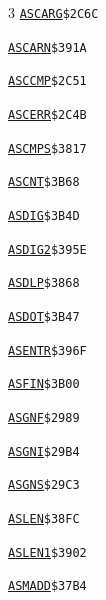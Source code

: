 \begin{multicols}{3}
\noindent\hyperlink{l:ASCARG}{\texttt{ASCARG}}\hfill\texttt{\$2C6C~\phantom{000}\llap{\pageref{l:ASCARG}}}\par
\noindent\hyperlink{l:ASCARN}{\texttt{ASCARN}}\hfill\texttt{\$391A~\phantom{000}\llap{\pageref{l:ASCARN}}}\par
\noindent\hyperlink{l:ASCCMP}{\texttt{ASCCMP}}\hfill\texttt{\$2C51~\phantom{000}\llap{\pageref{l:ASCCMP}}}\par
\noindent\hyperlink{l:ASCERR}{\texttt{ASCERR}}\hfill\texttt{\$2C4B~\phantom{000}\llap{\pageref{l:ASCERR}}}\par
\noindent\hyperlink{l:ASCMPS}{\texttt{ASCMPS}}\hfill\texttt{\$3817~\phantom{000}\llap{\pageref{l:ASCMPS}}}\par
\noindent\hyperlink{l:ASCNT}{\texttt{ASCNT}}\hfill\texttt{\$3B68~\phantom{000}\llap{\pageref{l:ASCNT}}}\par
\noindent\hyperlink{l:ASDIG}{\texttt{ASDIG}}\hfill\texttt{\$3B4D~\phantom{000}\llap{\pageref{l:ASDIG}}}\par
\noindent\hyperlink{l:ASDIG2}{\texttt{ASDIG2}}\hfill\texttt{\$395E~\phantom{000}\llap{\pageref{l:ASDIG2}}}\par
\noindent\hyperlink{l:ASDLP}{\texttt{ASDLP}}\hfill\texttt{\$3868~\phantom{000}\llap{\pageref{l:ASDLP}}}\par
\noindent\hyperlink{l:ASDOT}{\texttt{ASDOT}}\hfill\texttt{\$3B47~\phantom{000}\llap{\pageref{l:ASDOT}}}\par
\noindent\hyperlink{l:ASENTR}{\texttt{ASENTR}}\hfill\texttt{\$396F~\phantom{000}\llap{\pageref{l:ASENTR}}}\par
\noindent\hyperlink{l:ASFIN}{\texttt{ASFIN}}\hfill\texttt{\$3B00~\phantom{000}\llap{\pageref{l:ASFIN}}}\par
\noindent\hyperlink{l:ASGNF}{\texttt{ASGNF}}\hfill\texttt{\$2989~\phantom{000}\llap{\pageref{l:ASGNF}}}\par
\noindent\hyperlink{l:ASGNI}{\texttt{ASGNI}}\hfill\texttt{\$29B4~\phantom{000}\llap{\pageref{l:ASGNI}}}\par
\noindent\hyperlink{l:ASGNS}{\texttt{ASGNS}}\hfill\texttt{\$29C3~\phantom{000}\llap{\pageref{l:ASGNS}}}\par
\noindent\hyperlink{l:ASLEN}{\texttt{ASLEN}}\hfill\texttt{\$38FC~\phantom{000}\llap{\pageref{l:ASLEN}}}\par
\noindent\hyperlink{l:ASLEN1}{\texttt{ASLEN1}}\hfill\texttt{\$3902~\phantom{000}\llap{\pageref{l:ASLEN1}}}\par
\noindent\hyperlink{l:ASMADD}{\texttt{ASMADD}}\hfill\texttt{\$37B4~\phantom{000}\llap{\pageref{l:ASMADD}}}\par

\end{multicols}
